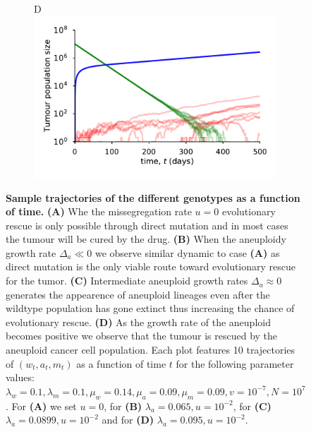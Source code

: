 \documentclass[12pt]{extarticle}
\begin{document}
\begin{figure}
\begin{subfigure}{0.5\textwidth}
\end{subfigure}
\begin{subfigure}{0.5\textwidth}
D\\
\includegraphics[width=1\textwidth]{Figures/TauLeapMeanTimeDiagramlargeda.pdf}
\end{subfigure}
\caption{
\textbf{Sample trajectories of the different genotypes as a function of time.}
\textbf{(A)} Whe the missegregation rate $u=0$ evolutionary rescue is only possible through direct mutation and in most cases the tumour will be cured by the drug. \textbf{(B)} When the aneuploidy growth rate $\Delta_a\ll0$ we observe similar dynamic to case \textbf{(A)} as direct mutation is the only viable route toward evolutionary rescue for the tumor. \textbf{(C)} Intermediate aneuploid growth rates $\Delta_a\approx0$ generates the appearence of aneuploid lineages even after the wildtype population has gone extinct thus increasing the chance of evolutionary rescue. \textbf{(D)} As the growth rate of the aneuploid becomes positive we observe that the tumour is rescued by the aneuploid cancer cell population. Each plot features 10 trajectories of $\left(w_t,a_t,m_t\right)$ as a function of time $t$ for the following parameter values: $\lambda_w=0.1,\lambda_m=0.1,\mu_w=0.14,\mu_a=0.09,\mu_m=0.09, v=10^{-7},N=10^7$. For \textbf{(A)} we set $u=0$, for \textbf{(B)} $\lambda_a=0.065,u=10^{-2}$, for \textbf{(C)} $\lambda_a=0.0899,u=10^{-2}$ and for \textbf{(D)}   $\lambda_a=0.095,u=10^{-2}$.
}
\label{sampleTrajectories}
\end{figure}

\end{document}
